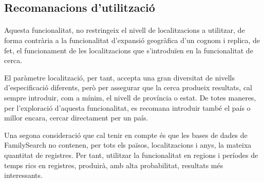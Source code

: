 \subsection{Recomanacions d'utilització}

    \paragraph{}
    Aquesta funcionalitat, no restringeix el nivell de localitzacions a utilitzar, de forma contrària a la funcionalitat d'expansió geogràfica d'un cognom i replica, de fet, el funcionament de les localitzacions  que s’introduïen en la funcionalitat de cerca.

    El paràmetre localització, per tant, accepta una gran diversitat de nivells d'especi\-fi\-ca\-ció diferents, però per assegurar que la cerca produeix resultats, cal sempre introduir, com a mínim, el nivell de província o estat. De totes maneres, per l'exploració d'aquesta funcionalitat, es recomana introduir també el país o millor encara, cercar directament per un país.

    Una segona consideració que cal tenir en compte és que les bases de dades de Family\-Search no contenen, per tots els països, localitzacions i anys, la mateixa quantitat de registres. Per tant, utilitzar la funcionalitat en regions i períodes de temps rics en registres, produirà, amb alta probabilitat, resultats més interessants.
